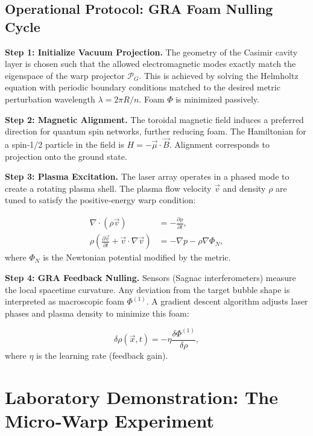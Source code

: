 \documentclass[11pt]{article}
\begin{document}
\subsection{Operational Protocol: GRA Foam Nulling Cycle}

\textbf{Step 1: Initialize Vacuum Projection.} The geometry of the Casimir cavity layer is chosen such that the allowed electromagnetic modes exactly match the eigenspace of the warp projector $\mathcal{P}_G$. This is achieved by solving the Helmholtz equation with periodic boundary conditions matched to the desired metric perturbation wavelength $\lambda = 2\pi R / n$. Foam $\Phi$ is minimized passively.

\textbf{Step 2: Magnetic Alignment.} The toroidal magnetic field induces a preferred direction for quantum spin networks, further reducing foam. The Hamiltonian for a spin‑1/2 particle in the field is $H = -\vec{\mu} \cdot \vec{B}$. Alignment corresponds to projection onto the ground state.

\textbf{Step 3: Plasma Excitation.} The laser array operates in a phased mode to create a rotating plasma shell. The plasma flow velocity $\vec{v}$ and density $\rho$ are tuned to satisfy the positive‑energy warp condition:

\begin{align}
\nabla \cdot (\rho \vec{v}) &= -\frac{\partial \rho}{\partial t}, \\
\rho \left( \frac{\partial \vec{v}}{\partial t} + \vec{v} \cdot \nabla \vec{v} \right) &= -\nabla p - \rho \nabla \Phi_N,
\end{align}
where $\Phi_N$ is the Newtonian potential modified by the metric.

\textbf{Step 4: GRA Feedback Nulling.} Sensors (Sagnac interferometers) measure the local spacetime curvature. Any deviation from the target bubble shape is interpreted as macroscopic foam $\Phi^{(1)}$. A gradient descent algorithm adjusts laser phases and plasma density to minimize this foam:

\begin{equation}
\delta \rho(\vec{x}, t) = -\eta \frac{\delta \Phi^{(1)}}{\delta \rho},
\label{eq:feedback}
\end{equation}
where $\eta$ is the learning rate (feedback gain).

\section{Laboratory Demonstration: The Micro‑Warp Experiment}
\end{document}
